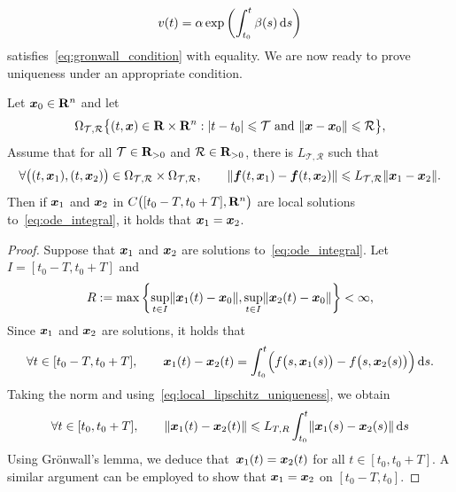\[
    v(t) = \alpha \exp \left( \int_{t_0}^{t} \beta(s) \, \mathrm d s \right)
\]
satisfies~\eqref{eq:gronwall_condition} with equality.
We are now ready to prove uniqueness under an appropriate condition.
\begin{theorem}
    \label{theorem:uniqueness}
    Let $\mathbf{\boldsymbol{x}}_0 \in \mathbf R^n$ and let
    \[
        \Omega_{\mathcal T, \mathcal R}
        \bigl\{(t, \mathbf{\boldsymbol{x}}) \in \mathbf R \times \mathbf R^n: \lvert t - t_0\rvert \leqslant \mathcal T \text{ and } \lVert\mathbf{\boldsymbol{x}} - \mathbf{\boldsymbol{x}}_0\rVert \leqslant \mathcal R \bigr\},
    \]
    Assume that for all $\mathcal T \in \mathbf R_{>0}$ and $\mathcal R \in \mathbf R_{>0}$,
    there is $L_{\mathcal T,  \mathcal R}$ such that
    \begin{equation}
        \label{eq:local_lipschitz_uniqueness}
        \forall \bigl((t, \mathbf{\boldsymbol{x}}_1), (t, \mathbf{\boldsymbol{x}}_2)\bigr) \in \Omega_{\mathcal T, \mathcal R} \times \Omega_{\mathcal T, \mathcal R}, \qquad
        \lVert \mathbf{\boldsymbol{f}}(t, \mathbf{\boldsymbol{x}}_1) - \mathbf{\boldsymbol{f}}(t, \mathbf{\boldsymbol{x}}_2) \rVert \leqslant L_{\mathcal T, \mathcal R} \lVert\mathbf{\boldsymbol{x}}_1 - \mathbf{\boldsymbol{x}}_2\rVert.
    \end{equation}
    Then if $\mathbf{\boldsymbol{x}}_1$ and $\mathbf{\boldsymbol{x}}_2$ in $C\bigl([t_0 - T, t_0 + T], \mathbf R^n\bigr)$ are local solutions to~\eqref{eq:ode_integral},
    it holds that $\mathbf{\boldsymbol{x}}_1 = \mathbf{\boldsymbol{x}}_2$.
\end{theorem}
\begin{proof}
    Suppose that $\mathbf{\boldsymbol{x}}_1$ and $\mathbf{\boldsymbol{x}}_2$ are solutions to~\eqref{eq:ode_integral}.
    Let~$I = [t_0 - T, t_0 + T]$ and
    \[
        R := \max \left\{ \sup_{t \in I} \lVert\mathbf{\boldsymbol{x}}_1(t) - \mathbf{\boldsymbol{x}}_0\rVert,   \sup_{t \in I} \lVert\mathbf{\boldsymbol{x}}_2(t) - \mathbf{\boldsymbol{x}}_0\rVert \right\} < \infty,
    \]
    Since $\mathbf{\boldsymbol{x}}_1$ and $\mathbf{\boldsymbol{x}}_2$ are solutions,
    it holds that
    \[
        \forall t \in [t_0 - T, t_0 + T], \qquad
        \mathbf{\boldsymbol{x}}_1(t) - \mathbf{\boldsymbol{x}}_2(t) = \int_{t_0}^{t} \Bigl( f\bigl(s, \mathbf{\boldsymbol{x}}_1(s)\bigr) - f\bigl(s, \mathbf{\boldsymbol{x}}_2(s)\bigr) \Bigr)  \, \mathrm d s.
    \]
    Taking the norm and using~\eqref{eq:local_lipschitz_uniqueness},
    we obtain
    \[
        \forall t \in [t_0, t_0 + T], \qquad
        \lVert\mathbf{\boldsymbol{x}}_1(t) - \mathbf{\boldsymbol{x}}_2(t)\rVert \leqslant L_{T,R} \int_{t_0}^{t} \lVert\mathbf{\boldsymbol{x}}_1(s) - \mathbf{\boldsymbol{x}}_2(s)\rVert \, \mathrm d s
    \]
    Using Gr\"onwall's lemma,
    we deduce that~$\mathbf{\boldsymbol{x}}_1(t) = \mathbf{\boldsymbol{x}}_2(t)$ for all $t \in [t_0, t_0 + T]$.
    A similar argument can be employed to show that $\mathbf{\boldsymbol{x}}_1 = \mathbf{\boldsymbol{x}}_2$ on $[t_0 - T, t_0]$.
\end{proof}

